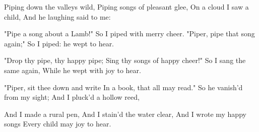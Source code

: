 
\begin{poem}

\begin{stanza}
Piping down the valleys wild,\verseline
\verseindent Piping songs of pleasant glee,\verseline
On a cloud I saw a child,\verseline
\verseindent And he laughing said to me:
\end{stanza}
\begin{stanza}
"Pipe a song about a Lamb!"\verseline
\verseindent So I piped with merry cheer.\verseline
"Piper, pipe that song again;"\verseline
\verseindent So I piped: he wept to hear.
\end{stanza}
\begin{stanza}
"Drop thy pipe, thy happy pipe;\verseline
\verseindent Sing thy songs of happy cheer!"\verseline
So I sang the same again,\verseline
\verseindent While he wept with joy to hear.
\end{stanza}
\begin{stanza}
"Piper, sit thee down and write\verseline
\verseindent In a book, that all may read."\verseline
So he vanish'd from my sight;\verseline
\verseindent And I pluck'd a hollow reed,
\end{stanza}
\begin{stanza}
And I made a rural pen,\verseline
\verseindent And I stain'd the water clear,\verseline
And I wrote my happy songs\verseline
\verseindent Every child may joy to hear.
\end{stanza}

\end{poem}